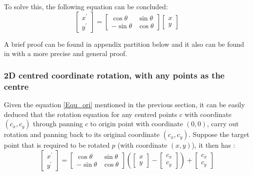 \par\noindent
To solve this, the following equation can be concluded:
\begin{equation} \label{Equ_ori}
  \begin{bmatrix}
   x^{'} \\ y^{'}
   \end{bmatrix} =   \begin{bmatrix}
      \cos\theta & \sin\theta \\
      -\sin\theta & \cos\theta
    \end{bmatrix} \begin{bmatrix}
      x \\ y
     \end{bmatrix}
\end{equation}

\par\noindent
A brief proof can be found in appendix partition below and it also can be found in \cite{Mitnote09} with a more precise and general proof.

\subsubsection{2D centred coordinate rotation, with any points as the centre}
Given the equation \ref{Equ_ori} mentioned in the previous section, it can be easily
deduced that the rotation equation for any centred points $c$ with coordinate $(c_{x}, c_{y})$ through
panning $c$ to origin point with coordinate $(0, 0)$, carry out rotation and panning back to its original coordinate $(c_{x}, c_{y})$.
Suppose the target point that is required to be rotated $p$ (with coordinate $(x, y)$), it then has :
\begin{equation} \label{Equ_anycen}
  \begin{bmatrix}
   x^{'} \\ y^{'}
   \end{bmatrix} =   \begin{bmatrix}
      \cos\theta & \sin\theta \\
      -\sin\theta & \cos\theta
    \end{bmatrix} \left(\begin{bmatrix}
      x \\ y
     \end{bmatrix} - \begin{bmatrix}
       c_{x} \\ c_{y}
     \end{bmatrix}\right) + \begin{bmatrix}
        c_{x} \\ c_{y}
       \end{bmatrix}
\end{equation}

